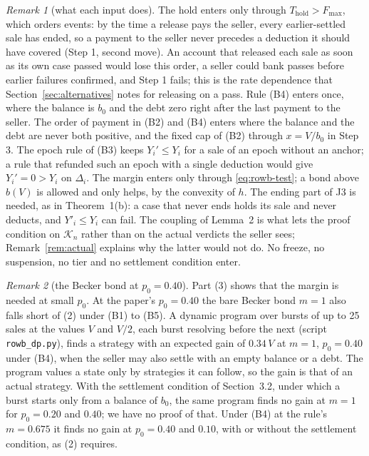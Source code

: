 \documentclass[10pt,a4paper]{article}
\newcommand{\Thold}{T_{\mathrm{hold}}}
\newcommand{\Fmax}{F_{\max}}
\newcommand{\cK}{\mathcal{K}}
\theoremstyle{plain}
\theoremstyle{remark}
\newtheorem{sremark}{Remark}
\begin{document}
\begin{sremark}[what each input does]\label{rem:rowb-inputs}
The hold enters only through $\Thold>\Fmax$, which orders events: by the time a release pays the seller, every earlier-settled sale has ended, so a payment to the seller never precedes a deduction it should have covered (Step 1, second move). An account that released each sale as soon as its own case passed would lose this order, a seller could bank passes before earlier failures confirmed, and Step 1 fails; this is the rate dependence that Section~\ref{sec:alternatives} notes for releasing on a pass. Rule (B4) enters once, where the balance is $b_0$ and the debt zero right after the last payment to the seller. The order of payment in (B2) and (B4) enters where the balance and the debt are never both positive, and the fixed cap of (B2) through $x=V/b_0$ in Step 3. The epoch rule of (B3) keeps $Y_i'\le Y_i$ for a sale of an epoch without an anchor; a rule that refunded such an epoch with a single deduction would give $Y_i'=0>Y_i$ on $\Delta_i$. The margin enters only through \eqref{eq:rowb-test}; a bond above $b(V)$ is allowed and only helps, by the convexity of $h$. The ending part of J3 is needed, as in Theorem~1(b): a case that never ends holds its sale and never deducts, and $Y'_i\le Y_i$ can fail. The coupling of Lemma~2 is what lets the proof condition on $\cK_n$ rather than on the actual verdicts the seller sees; Remark~\ref{rem:actual} explains why the latter would not do. No freeze, no suspension, no tier and no settlement condition enter.
\end{sremark}

\begin{sremark}[the Becker bond at $p_0=0.40$]\label{rem:rowb-becker}
Part (3) shows that the margin is needed at small $p_0$. At the paper's $p_0=0.40$ the bare Becker bond $m=1$ also falls short of (2) under (B1) to (B5). A dynamic program over bursts of up to 25 sales at the values $V$ and $V/2$, each burst resolving before the next (script \texttt{rowb\_dp.py}), finds a strategy with an expected gain of $0.34\,V$ at $m=1$, $p_0=0.40$ under (B4), when the seller may also settle with an empty balance or a debt. The program values a state only by strategies it can follow, so the gain is that of an actual strategy. With the settlement condition of Section~3.2, under which a burst starts only from a balance of $b_0$, the same program finds no gain at $m=1$ for $p_0=0.20$ and $0.40$; we have no proof of that. Under (B4) at the rule's $m=0.675$ it finds no gain at $p_0=0.40$ and $0.10$, with or without the settlement condition, as (2) requires.
\end{sremark}
\end{document}
